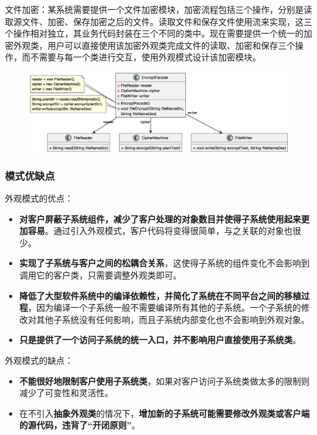 文件加密：某系统需要提供一个文件加密模块，加密流程包括三个操作，分别是读取源文件、加密、保存加密之后的文件。读取文件和保存文件使用流来实现，这三个操作相对独立，其业务代码封装在三个不同的类中。现在需要提供一个统一的加密外观类，用户可以直接使用该加密外观类完成文件的读取、加密和保存三个操作，而不需要与每一个类进行交互，使用外观模式设计该加密模块。
\begin{figure}[H]
    \vspace{-0.5em}
	\centering
	\includegraphics[width=\textwidth]{images/外观模式实例2.eps}
    \vspace{-1em}
\end{figure}

\subsubsection{模式优缺点}
外观模式的优点：
\begin{itemize}
    \item \textbf{对客户屏蔽子系统组件，减少了客户处理的对象数目并使得子系统使用起来更加容易}。通过引入外观模式，客户代码将变得很简单，与之关联的对象也很少。
    \item \textbf{实现了子系统与客户之间的松耦合关系}，这使得子系统的组件变化不会影响到调用它的客户类，只需要调整外观类即可。
    \item \textbf{降低了大型软件系统中的编译依赖性，并简化了系统在不同平台之间的移植过程}，因为编译一个子系统一般不需要编译所有其他的子系统。一个子系统的修改对其他子系统没有任何影响，而且子系统内部变化也不会影响到外观对象。
    \item \textbf{只是提供了一个访问子系统的统一入口，并不影响用户直接使用子系统类}。
\end{itemize}

外观模式的缺点：
\begin{itemize}
    \item \textbf{不能很好地限制客户使用子系统类}，如果对客户访问子系统类做太多的限制则减少了可变性和灵活性。
    \item 在不引入\textbf{抽象外观类}的情况下，\textbf{增加新的子系统可能需要修改外观类或客户端的源代码，违背了“开闭原则”}。
\end{itemize}

